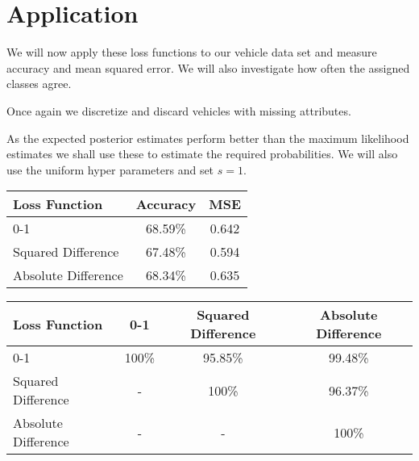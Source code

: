 \section{Application}
We will now apply these loss functions to our vehicle data set and measure accuracy and mean squared error.
We will also investigate how often the assigned classes agree.

Once again we discretize and discard vehicles with missing attributes.

As the expected posterior estimates perform better than the maximum likelihood estimates we shall use these to estimate the required probabilities.
We will also use the uniform hyper parameters and set $s=1$.

\begin{center}
\begin{tabular}{l|c c}
	Loss Function       & Accuracy & MSE   \\
	\hline
	0-1                 & 68.59\%  & 0.642 \\
	Squared Difference  & 67.48\%  & 0.594 \\
	Absolute Difference & 68.34\%  & 0.635 \\
\end{tabular}
\end{center}

\begin{center}
\begin{tabular}{l|c c c}
	Loss Function       & 0-1     & Squared Difference & Absolute Difference   \\
	\hline
	0-1                 & 100\% & 95.85\% & 99.48\% \\
	Squared Difference  & - & 100\% & 96.37\%\\
	Absolute Difference & - & - & 100\% \\
\end{tabular}
\end{center}